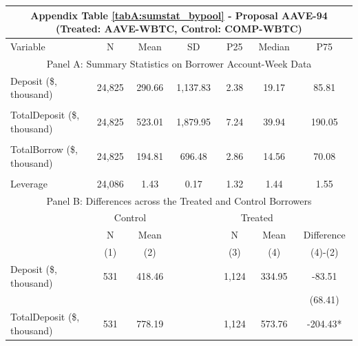 
\clearpage
\newpage
    

\begin{table}[ht!]
\footnotesize 

\centering
\def\sym#1{\ifmmode^{#1}\else\(^{#1}\)\fi}


\begin{tabular*}{\linewidth}{@{\extracolsep{\fill}}lcccccc }
      \multicolumn{7}{c}{Appendix Table \ref{tabA:sumstat_bypool} - Proposal AAVE-94 (Treated: AAVE-WBTC, Control: COMP-WBTC)} \\
    \toprule
     Variable  &N & Mean & SD & P25 & Median & P75 \\
     \midrule
    \multicolumn{7}{c}{Panel A: Summary Statistics on Borrower Account-Week Data} \\
    \midrule
    Deposit (\$, thousand) & 24,825 & 290.66 & 1,137.83 & 2.38  & 19.17 & 85.81 \\
          &       &       &       &       &       &  \\
    TotalDeposit (\$, thousand) & 24,825 & 523.01 & 1,879.95 & 7.24  & 39.94 & 190.05 \\
          &       &       &       &       &       &  \\
    TotalBorrow (\$, thousand) & 24,825 & 194.81 & 696.48 & 2.86  & 14.56 & 70.08 \\
          &       &       &       &       &       &  \\
    Leverage & 24,086 & 1.43  & 0.17  & 1.32  & 1.44  & 1.55 \\
    \midrule
        \multicolumn{7}{c}{Panel B: Differences across the Treated and Control Borrowers} \\
\midrule
          & \multicolumn{2}{c}{Control} &       & \multicolumn{2}{c}{Treated} &  \\
\cmidrule{2-3}\cmidrule{5-6}          & N & Mean &       & N & Mean & Difference \\
\cmidrule{2-3}\cmidrule{5-6}          & (1) & (2) &       & (3) & (4) & (4)-(2) \\
\cmidrule{2-7}    Deposit (\$, thousand) & 531   & 418.46 &       & 1,124 & 334.95 & -83.51 \\
          &       &       &       &       &       & (68.41) \\
    TotalDeposit (\$, thousand) & 531   & 778.19 &       & 1,124 & 573.76 & -204.43* \\

\end{tabular*}
\end{table}
